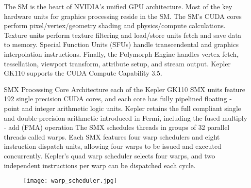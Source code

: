 The SM is the heart of NVIDIA’s unified GPU architecture. Most of the key hardware units for graphics processing reside in the SM. The SM’s CUDA cores perform pixel/vertex/geometry shading and physics/compute calculations. Texture units perform texture filtering and load/store units fetch and save data to memory. Special Function Units (SFUs) handle transcendental and graphics interpolation instructions. Finally, the Polymorph Engine handles vertex fetch, tessellation, viewport transform, attribute setup, and stream output. Kepler GK110 supports the CUDA Compute Capability 3.5.

SMX Processing Core Architecture each of the Kepler GK110 SMX units feature 192 single precision CUDA cores, and each core has fully pipelined floating ‐ point and integer arithmetic logic units. Kepler retains the full compliant single and double‐precision arithmetic introduced in Fermi, including the fused multiply - add (FMA) operation
The SMX schedules threads in groups of 32 parallel threads called warps. Each SMX features four warp schedulers and eight instruction dispatch units, allowing four warps to be issued and executed concurrently. Kepler’s quad warp scheduler selects four warps, and two independent instructions per warp can be dispatched each cycle.

 \begin{figure}[H]
    \centering
        \texttt{[image: warp\_scheduler.jpg]}
    \caption{}
    \label{fig:warp_scheduler}
\end{figure}

